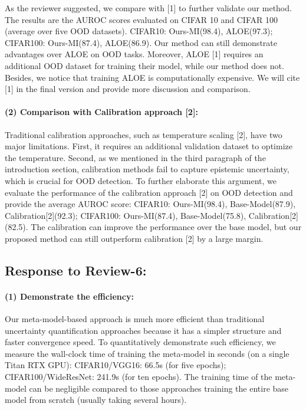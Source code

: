 As the reviewer suggested, we compare with [1] to further validate our method.  The results are the AUROC scores evaluated on CIFAR 10 and CIFAR 100 (average over five OOD datasets). CIFAR10: Ours-MI(98.4), ALOE(97.3);  CIFAR100: Ours-MI(87.4), ALOE(86.9). Our method can still demonstrate advantages over ALOE on OOD tasks. Moreover, ALOE [1] requires an additional OOD dataset for training their model, while our method does not. Besides, we notice that training ALOE is computationally expensive. %
We will cite [1] in the final version and provide more discussion and comparison. 

\paragraph{(2) Comparison with Calibration approach [2]:}

Traditional calibration approaches, such as temperature scaling [2], have two major limitations. First, it requires an additional validation dataset to optimize the temperature. Second, as we mentioned in the third paragraph of the introduction section, calibration methods fail to capture epistemic uncertainty, which is crucial for OOD detection. To further elaborate this argument, we evaluate the performance of the calibration approach [2] on OOD detection and provide the average AUROC score: CIFAR10: Ours-MI(98.4), Base-Model(87.9), Calibration[2](92.3); CIFAR100: Ours-MI(87.4), Base-Model(75.8), Calibration[2](82.5). The calibration can improve the performance over the base model, but our proposed method can still outperform calibration [2] by a large margin.


\subsection{Response to Review-6:}

\paragraph{(1) Demonstrate the efficiency:}

Our meta-model-based approach is much more efficient than traditional uncertainty quantification approaches because it has a simpler structure and faster convergence speed. To quantitatively demonstrate such efficiency, we measure the wall-clock time of training the meta-model in seconds (on a single Titan RTX GPU): CIFAR10/VGG16: 66.5s (for five epochs); CIFAR100/WideResNet: 241.9s (for ten epochs). The training time of the meta-model can be negligible compared to those approaches training the entire base model from scratch (usually taking several hours).








